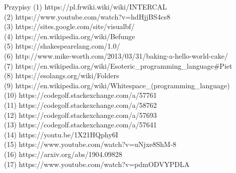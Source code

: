 \begin{frame}{\hypertarget{frame:przypisy}{Przypisy}}
	\vspace*{0.1cm}
	{\small
    (1) https://pl.frwiki.wiki/wiki/INTERCAL \\
    (2) https://www.youtube.com/watch?v=hdHjjBS4cs8 \\
    (3) https://sites.google.com/site/visualbf/ \\
    (4) https://en.wikipedia.org/wiki/Befunge \\
    (5) https://shakespearelang.com/1.0/ \\
    (6) http://www.mike-worth.com/2013/03/31/baking-a-hello-world-cake/ \\
    (7) https://en.wikipedia.org/wiki/Esoteric\_programming\_language\#Piet \\
    (8) https://esolangs.org/wiki/Folders \\
    (9) https://en.wikipedia.org/wiki/Whitespace\_(programming\_language) \\
    (10) https://codegolf.stackexchange.com/a/57761 \\
    (11) https://codegolf.stackexchange.com/a/58762 \\
    (12) https://codegolf.stackexchange.com/a/57693 \\
    (13) https://codegolf.stackexchange.com/a/57641 \\
    (14) https://youtu.be/1X21HQphy6I \\
    (15) https://www.youtube.com/watch?v=uNjxe8ShM-8 \\
    (16) https://arxiv.org/abs/1904.09828 \\
    (17) https://www.youtube.com/watch?v=pdmODVYPDLA
	}
\end{frame}
